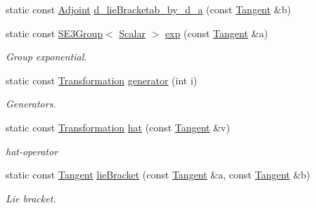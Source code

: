 \begin{DoxyCompactItemize}
\item 
static const \hyperlink{class_sophus_1_1_s_e3_group_base_ac2e0179cb3e9490604c417d8e59a92d3}{Adjoint} \hyperlink{class_sophus_1_1_s_e3_group_base_acc169d84df086c8d5f73495a18fd66bd}{d\+\_\+lie\+Bracketab\+\_\+by\+\_\+d\+\_\+a} (const \hyperlink{class_sophus_1_1_s_e3_group_base_a45f63b562f0614853cef2c04c4cd5f2b}{Tangent} \&b)
\item 
static const \hyperlink{class_sophus_1_1_s_e3_group}{S\+E3\+Group}$<$ \hyperlink{class_sophus_1_1_s_e3_group_base_aa3db86a2cabe32d3c299dda41af181cc}{Scalar} $>$ \hyperlink{class_sophus_1_1_s_e3_group_base_ad9e943a9cb045a10374675f29a1d41e5}{exp} (const \hyperlink{class_sophus_1_1_s_e3_group_base_a45f63b562f0614853cef2c04c4cd5f2b}{Tangent} \&a)
\begin{DoxyCompactList}\small\item\em Group exponential. \end{DoxyCompactList}\item 
static const \hyperlink{class_sophus_1_1_s_e3_group_base_a426ebd53f324a4fd6d36c28028f967f1}{Transformation} \hyperlink{class_sophus_1_1_s_e3_group_base_a72c23eacff9654ba3f2910768ed6d763}{generator} (int i)
\begin{DoxyCompactList}\small\item\em Generators. \end{DoxyCompactList}\item 
static const \hyperlink{class_sophus_1_1_s_e3_group_base_a426ebd53f324a4fd6d36c28028f967f1}{Transformation} \hyperlink{class_sophus_1_1_s_e3_group_base_a763d7ccf6abe0a5de2d460176e6c3a3a}{hat} (const \hyperlink{class_sophus_1_1_s_e3_group_base_a45f63b562f0614853cef2c04c4cd5f2b}{Tangent} \&v)
\begin{DoxyCompactList}\small\item\em hat-\/operator \end{DoxyCompactList}\item 
static const \hyperlink{class_sophus_1_1_s_e3_group_base_a45f63b562f0614853cef2c04c4cd5f2b}{Tangent} \hyperlink{class_sophus_1_1_s_e3_group_base_a25c744576c6065bc06ba07ceda58a61c}{lie\+Bracket} (const \hyperlink{class_sophus_1_1_s_e3_group_base_a45f63b562f0614853cef2c04c4cd5f2b}{Tangent} \&a, const \hyperlink{class_sophus_1_1_s_e3_group_base_a45f63b562f0614853cef2c04c4cd5f2b}{Tangent} \&b)
\begin{DoxyCompactList}\small\item\em Lie bracket. \end{DoxyCompactList}\item 

\end{DoxyCompactItemize}
